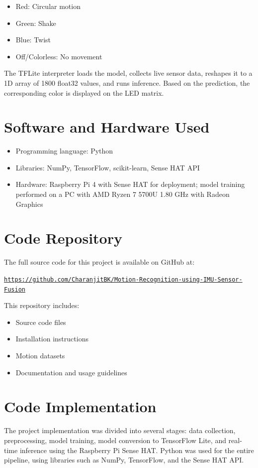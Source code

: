 \documentclass[a4paper,12pt]{article}
\begin{document}
\begin{itemize}
    \item Red: Circular motion
    \item Green: Shake
    \item Blue: Twist
    \item Off/Colorless: No movement
\end{itemize}

The TFLite interpreter loads the model, collects live sensor data, reshapes it to a 1D array of 1800 float32 values, and runs inference. Based on the prediction, the corresponding color is displayed on the LED matrix.

\section{Software and Hardware Used}
\begin{itemize}
    \item Programming language: Python
    \item Libraries: NumPy, TensorFlow, scikit-learn, Sense HAT API
    \item Hardware: Raspberry Pi 4 with Sense HAT for deployment; model training performed on a PC with AMD Ryzen 7 5700U 1.80 GHz with Radeon Graphics
\end{itemize}

\section{Code Repository}
The full source code for this project is available on GitHub at:

\begin{center}
\href{https://github.com/yourusername/your-repository}{\texttt{https://github.com/CharanjitBK/Motion-Recognition-using-IMU-Sensor-Fusion}}
\end{center}

This repository includes:
\begin{itemize}
    \item Source code files
    \item Installation instructions
    \item Motion datasets
    \item Documentation and usage guidelines
\end{itemize}

\section{Code Implementation}
The project implementation was divided into several stages: data collection, preprocessing, model training, model conversion to TensorFlow Lite, and real-time inference using the Raspberry Pi Sense HAT. Python was used for the entire pipeline, using libraries such as NumPy, TensorFlow, and the Sense HAT API.
\end{document}
